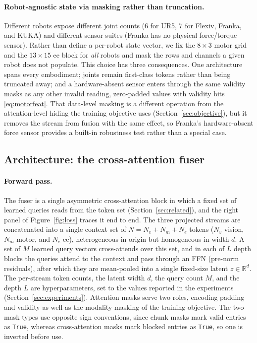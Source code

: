 \documentclass{article}
\begin{document}
\paragraph{Robot-agnostic state via masking rather than truncation.}
Different robots expose different joint counts (6 for UR5, 7 for Flexiv, Franka, and KUKA) and different sensor suites (Franka has no physical force/torque sensor). Rather than define a per-robot state vector, we fix the $8\times3$ motor grid and the $13\times15$ ee block for \emph{all} robots and mask the rows and channels a given robot does not populate. This choice has three consequences. One architecture spans every embodiment; joints remain first-class tokens rather than being truncated away; and a hardware-absent sensor enters through the same validity masks as any other invalid reading, zero-padded values with validity bits \eqref{eq:motorfeat}. That data-level masking is a different operation from the attention-level hiding the training objective uses (Section~\ref{sec:objective}), but it removes the stream from fusion with the same effect, so Franka's hardware-absent force sensor provides a built-in robustness test rather than a special case.

\subsection{Architecture: the cross-attention fuser}
\label{sec:arch}

\paragraph{Forward pass.} The fuser is a single asymmetric cross-attention
block in which a fixed set of learned queries reads from the token set (Section~\ref{sec:related}), and the right panel of Figure~\ref{fig:loss} traces it end to end. The three projected streams are concatenated into a single context set of $N = N_v + N_m + N_e$ tokens ($N_v$ vision, $N_m$ motor, and $N_e$ ee), heterogeneous in origin but homogeneous in width $d$. A set of $M$ learned query vectors cross-attends over this set, and in each of $L$ depth blocks the queries attend to the context and pass through an FFN (pre-norm residuals), after which they are mean-pooled into a single fixed-size latent $z\in\mathbb{R}^{d}$. The per-stream token counts, the latent width $d$, the query count $M$, and the depth $L$ are hyperparameters, set to the values reported in the experiments (Section~\ref{sec:experiments}). Attention masks serve two roles, encoding padding and validity as well as the modality masking of the training objective. The two mask types use opposite sign conventions, since chunk masks mark valid entries as \texttt{True}, whereas cross-attention masks mark blocked entries as \texttt{True}, so one is inverted before use.
\end{document}
